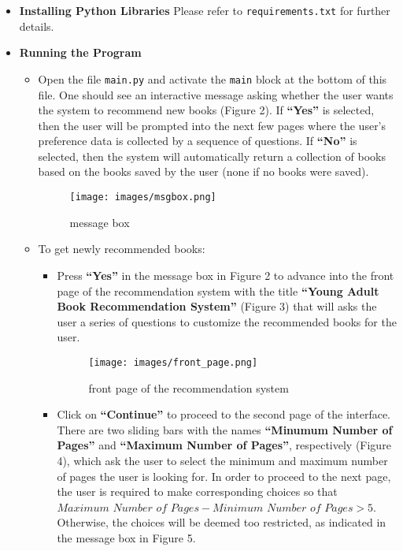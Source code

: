 \documentclass[fontsize=11pt]{article}
\begin{document}
\begin{itemize}
    \item \textbf{Installing Python Libraries} Please refer to \texttt{requirements.txt} for further details.
    \item \textbf{Running the Program}
    \begin{itemize}
        \item Open the file \texttt{main.py} and activate the \texttt{main} block at the bottom of this file. One should see an interactive message asking whether the user wants the system to recommend new books (Figure 2). If \textbf{``Yes''} is selected, then the user will be prompted into the next few pages where the user's preference data is collected by a sequence of questions. If \textbf{``No''} is selected, then the system will automatically return a collection of books based on the books saved by the user (none if no books were saved).
        \begin{figure}[h!]
            \centering
            \texttt{[image: images/msgbox.png]}
            \caption{message box}
            \label{fig:x cubed graph}
        \end{figure}
        \item To get newly recommended books:
        \begin{itemize}
            \item Press \textbf{``Yes''} in the message box in Figure 2 to advance into the front page of the recommendation system with the title \textbf{``Young Adult Book Recommendation System''} (Figure 3) that will asks the user a series of questions to customize the recommended books for the user.
            \begin{figure}[h!]
            \centering
                \texttt{[image: images/front\_page.png]}
                \caption{front page of the recommendation system}
                \label{fig:x cubed graph}
            \end{figure}
            \item Click on \textbf{``Continue''} to proceed to the second page of the interface. There are two sliding bars with the names \textbf{``Minumum Number of Pages''} and \textbf{``Maximum Number of Pages''}, respectively (Figure 4), which ask the user to select the minimum and maximum number of pages the user is looking for. In order to proceed to the next page, the user is required to make corresponding choices so that $\textit{Maximum Number of Pages} - \textit{Minimum Number of Pages} > 5$. Otherwise, the choices will be deemed too restricted, as indicated in the message box in Figure 5.

\end{itemize}
\end{itemize}
\end{itemize}
\end{document}
